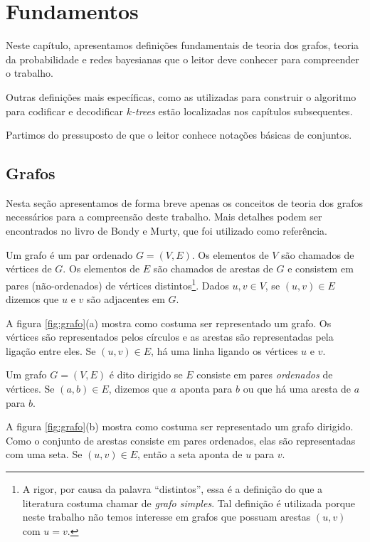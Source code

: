 \chapter{Fundamentos}
\label{cap:fundamentos}

Neste capítulo, apresentamos definições fundamentais de teoria dos grafos, teoria da probabilidade e redes bayesianas que o leitor deve conhecer para compreender o trabalho.

Outras definições mais específicas, como as utilizadas para construir o algoritmo para codificar e decodificar \emph{$k$-trees} estão localizadas nos capítulos subsequentes.

Partimos do pressuposto de que o leitor conhece notações básicas de conjuntos.

\section{Grafos}

Nesta seção apresentamos de forma breve apenas os conceitos de teoria dos grafos necessários para a compreensão deste trabalho. Mais detalhes podem ser encontrados no livro de Bondy e Murty\cite{bondy}, que foi utilizado como referência.

\begin{definition}[grafo]
  Um grafo é um par ordenado $G = (V, E)$. Os elementos de $V$ são chamados de vértices de $G$. Os elementos de $E$ são chamados de arestas de $G$ e consistem em pares (não-ordenados) de vértices distintos\footnote{A rigor, por causa da palavra ``distintos'', essa é a definição do que a literatura costuma chamar de \emph{grafo simples}. Tal definição é utilizada porque neste trabalho não temos interesse em grafos que possuam arestas $(u, v)$ com $u=v$.}. Dados $u, v \in V$, se $(u, v) \in E$ dizemos que $u$ e $v$ são adjacentes em $G$.

  A figura \ref{fig:grafo}(a) mostra como costuma ser representado um grafo. Os vértices são representados pelos círculos e as arestas são representadas pela ligação entre eles. Se $(u, v) \in E$, há uma linha ligando os vértices $u$ e $v$.
\end{definition}

\begin{definition}
  Um grafo $G = (V, E)$ é dito dirigido se $E$ consiste em pares \emph{ordenados} de vértices. Se $(a, b) \in E$, dizemos que $a$ aponta para $b$ ou que há uma aresta de $a$ para $b$.

  A figura \ref{fig:grafo}(b) mostra como costuma ser representado um grafo dirigido. Como o conjunto de arestas consiste em pares ordenados, elas são representadas com uma seta. Se $(u, v) \in E$, então a seta aponta de $u$ para $v$.
\end{definition}

